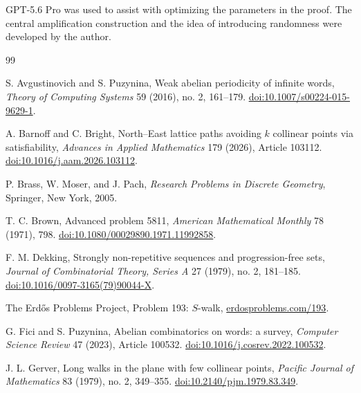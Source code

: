 \documentclass[11pt]{article}
\theoremstyle{plain}
\theoremstyle{definition}
\theoremstyle{remark}
\begin{document}
GPT-5.6 Pro was used to assist with optimizing the parameters in the proof. The central amplification construction and the idea of introducing randomness were developed by the author.

\begin{thebibliography}{99}

S. Avgustinovich and S. Puzynina,
\newblock Weak abelian periodicity of infinite words,
\newblock \emph{Theory of Computing Systems} 59 (2016), no. 2, 161--179.
\newblock \href{https://doi.org/10.1007/s00224-015-9629-1}{doi:10.1007/s00224-015-9629-1}.

A. Barnoff and C. Bright,
\newblock North--East lattice paths avoiding \(k\) collinear points via satisfiability,
\newblock \emph{Advances in Applied Mathematics} 179 (2026), Article 103112.
\newblock \href{https://doi.org/10.1016/j.aam.2026.103112}{doi:10.1016/j.aam.2026.103112}.

P. Brass, W. Moser, and J. Pach,
\newblock \emph{Research Problems in Discrete Geometry},
\newblock Springer, New York, 2005.

T. C. Brown,
\newblock Advanced problem 5811,
\newblock \emph{American Mathematical Monthly} 78 (1971), 798.
\newblock \href{https://doi.org/10.1080/00029890.1971.11992858}{doi:10.1080/00029890.1971.11992858}.

F. M. Dekking,
\newblock Strongly non-repetitive sequences and progression-free sets,
\newblock \emph{Journal of Combinatorial Theory, Series A} 27 (1979), no. 2, 181--185.
\newblock \href{https://doi.org/10.1016/0097-3165(79)90044-X}{doi:10.1016/0097-3165(79)90044-X}.

The Erd\H{o}s Problems Project,
\newblock Problem 193: \(S\)-walk,
\newblock \href{https://www.erdosproblems.com/193}{erdosproblems.com/193}.

G. Fici and S. Puzynina,
\newblock Abelian combinatorics on words: a survey,
\newblock \emph{Computer Science Review} 47 (2023), Article 100532.
\newblock \href{https://doi.org/10.1016/j.cosrev.2022.100532}{doi:10.1016/j.cosrev.2022.100532}.

J. L. Gerver,
\newblock Long walks in the plane with few collinear points,
\newblock \emph{Pacific Journal of Mathematics} 83 (1979), no. 2, 349--355.
\newblock \href{https://doi.org/10.2140/pjm.1979.83.349}{doi:10.2140/pjm.1979.83.349}.


\end{thebibliography}
\end{document}
